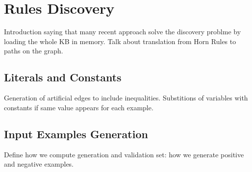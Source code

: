 \section{Rules Discovery}
Introduction saying that many recent approach solve the discovery problme by loading the whole KB in memory.
Talk about translation from Horn Rules to paths on the graph.


\subsection{Literals and Constants}
Generation of artificial edges to include inequalities.
Substitions of variables with constants if same value appears for each example.

\subsection{Input Examples Generation}
Define how we compute generation and validation set: how we generate positive and negative examples.